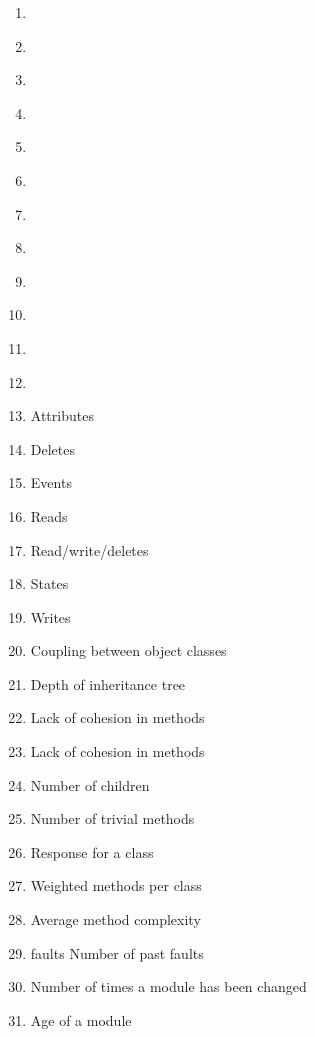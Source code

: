 \documentclass{article}
\begin{document}
{\begin{pptWide}{5}
\begin{enumerate}
  \item \textbf{}
  \item \textbf{}
  \item \textbf{}
  \item \textbf{}
  \item \textbf{}
  \item \textbf{}
  \item \textbf{}
  \item \textbf{}
  \item \textbf{}
  \item \textbf{}
  \item \textbf{}
  \item \textbf{}
  \item \textbf{} Attributes
  \item \textbf{} Deletes
  \item \textbf{} Events
  \item \textbf{} Reads
  \item \textbf{} Read/write/deletes
  \item \textbf{} States
  \item \textbf{} Writes
  \item \textbf{} Coupling between object classes
  \item \textbf{} Depth of inheritance tree
  \item \textbf{} Lack of cohesion in methods
  \item \textbf{} Lack of cohesion in methods
  \item \textbf{} Number of children
  \item \textbf{} Number of trivial methods
  \item \textbf{} Response for a class
  \item \textbf{} Weighted methods per class
  \item \textbf{} Average method complexity
  \item \textbf{} faults Number of past faults
  \item \textbf{} Number of times a module has been changed
  \item \textbf{} Age of a module

\end{enumerate}
\end{pptWide}}
\end{document}
